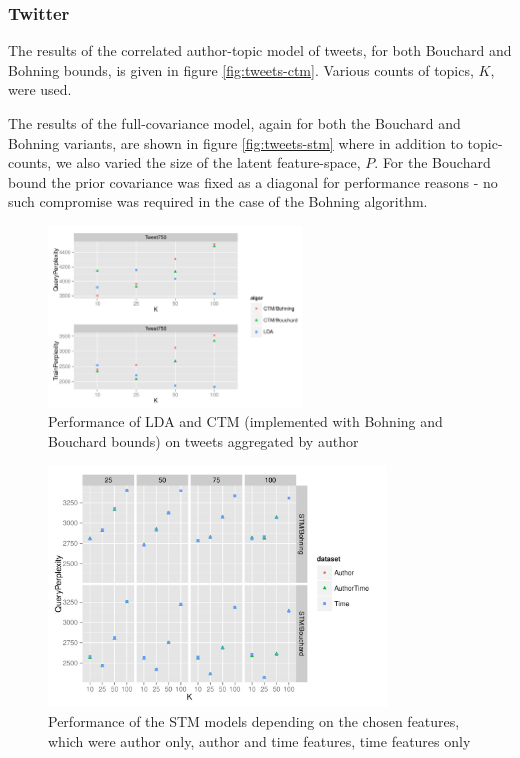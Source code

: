 \subsubsection*{Twitter}
The results of the correlated author-topic model of tweets, for both Bouchard and Bohning bounds, is given in figure \ref{fig:tweets-ctm}. Various counts of topics, $K$,  were used.

The results of the full-covariance model, again for both the Bouchard and Bohning variants, are shown in figure \ref{fig:tweets-stm} where in addition to topic-counts, we also varied the size of the latent feature-space, $P$. For the Bouchard bound the prior covariance was fixed as a diagonal for performance reasons - no such compromise was required in the case of the Bohning algorithm.

\begin{figure}
\centering
    \includegraphics[width=0.6\textwidth]{plots/TweetCtmLda.pdf}
    \caption{Performance of LDA and CTM (implemented with Bohning and Bouchard bounds) on tweets aggregated by author}
    \label{fig:tweet-ctm-lda}
\end{figure}

\begin{figure}
\centering
    \includegraphics[width=0.8\textwidth]{plots/TweetStmQueryFeatures.pdf}
    \caption{Performance of the STM models depending on the chosen features, which were author only, author and time features, time features only}
    \label{fig:tweet-ctm-lda}
\end{figure}

